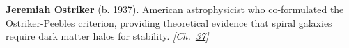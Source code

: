 \textbf{Jeremiah Ostriker} (b. 1937). American astrophysicist who co-formulated the Ostriker-Peebles criterion, providing theoretical evidence that spiral galaxies require dark matter halos for stability. \emph{[Ch.~\hyperref[ch:darkmatterevidence]{37}]}


